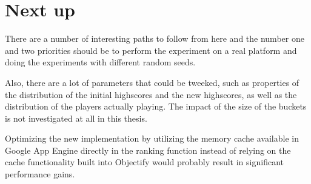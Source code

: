 \section*{Next up}

There are a number of interesting paths to follow from here and the number one and two priorities should be to perform the experiment on a real platform and doing the experiments with different random seeds.

\clearpage

Also, there are a lot of parameters that could be tweeked, such as properties of the distribution of the initial highscores and the new highscores, as well as the distribution of the players actually playing. The impact of the size of the buckets is not investigated at all in this thesis.

Optimizing the new implementation by utilizing the memory cache available in Google App Engine directly in the ranking function instead of relying on the cache functionality built into Objectify would probably result in significant performance gains.
